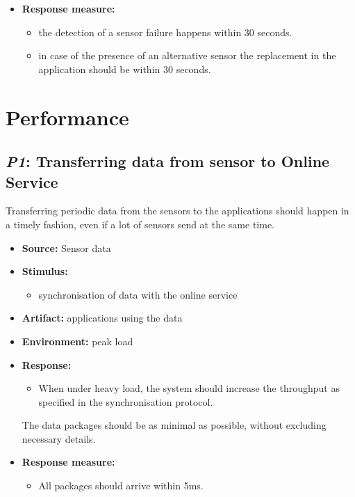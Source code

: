 \documentclass[english]{sareport}
\begin{document}
\begin{itemize}
    \item \textbf{Response measure:}
        \begin{itemize}
            \item the detection of a sensor failure happens within 30 seconds.
            \item in case of the presence of an alternative sensor the replacement in the application should be within 30 seconds.
        \end{itemize}
\end{itemize}
\section{Performance}
\subsection{\emph{P1}: Transferring data from sensor to Online Service}
Transferring periodic data from the sensors to the applications should happen in a timely fashion, even if a lot of sensors send at the same time.

\begin{itemize}
    \item \textbf{Source:} Sensor data
    \item \textbf{Stimulus:}
        \begin{itemize}
            \item synchronisation of data with the online service
        \end{itemize}

    \item \textbf{Artifact:} applications using the data
    \item \textbf{Environment:} peak load
    \item \textbf{Response:}
        \begin{itemize}
            \item When under heavy load, the system should increase the throughput as specified in the synchronisation protocol.
        \end{itemize} The data packages should be as minimal as possible, without excluding necessary details.
    \item \textbf{Response measure:}
        \begin{itemize}
            \item All packages should arrive within 5ms.
        \end{itemize}
\end{itemize}
\end{document}
